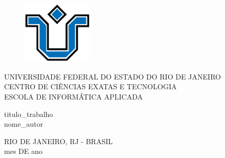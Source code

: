 \documentclass[a4paper,12pt]{article}
\begin{document}
\begin{figure}[t]
    \centering
    \includegraphics[width=0.3\textwidth]{logo.png}
\end{figure}

\begin{center}
    {\uppercase{\large UNIVERSIDADE FEDERAL DO ESTADO DO RIO DE JANEIRO}} \\
    {\uppercase{\large CENTRO DE CIÊNCIAS EXATAS E TECNOLOGIA}} \\
    {\uppercase{\large ESCOLA DE INFORMÁTICA APLICADA}}
\end{center}

\vspace{3cm}

\begin{center}
    {\large {{ titulo_trabalho }} \\}
    \vspace{5cm}
    {\large {{ nome_autor }}}
\end{center}

\vspace{\fill}

\begin{center}
    RIO DE JANEIRO, RJ - BRASIL \\
    {{ mes }} DE {{ ano }}
\end{center}

\newpage

\tableofcontents
\newpage
\end{document}
